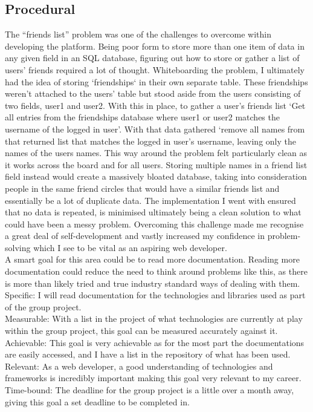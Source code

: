 \documentclass[lettersize,journal]{IEEEtran}
\begin{document}
\subsection{Procedural}
The “friends list” problem was one of the  challenges to overcome within developing the platform. Being poor form to store more than one item of data in any given field in an SQL database,
figuring out how to store or gather a list of users' friends required a lot of thought. Whiteboarding the problem, I ultimately had the idea of storing `friendships` in their own separate
table. These friendships weren’t attached to the users' table but stood aside from the users  consisting of two fields, user1 and user2. With this in place, to gather a user's friends
list ‘Get all entries from the friendships database where user1 or user2 matches the username of the logged in user’. With that data gathered ‘remove all names from that returned list
that matches the logged in user's username, leaving only the names of the users names. This way around the problem felt particularly clean as it works across the board and for all users.
Storing multiple names in a friend list field instead would create a massively bloated database, taking into consideration people in the same friend circles that would have a similar
friends list and essentially be a lot of duplicate data. The implementation I went with ensured that no data is repeated, is minimised ultimately being a clean solution to what could
have been a messy problem. Overcoming this challenge made me recognise a great deal of self-development and vastly increased my confidence in problem-solving which I see to be vital as an 
aspiring web developer.
\\ A smart goal for this area could be to read more documentation. Reading more documentation could reduce the need to think around problems like this, as there is more than likely tried and true 
industry standard ways of dealing with them.
\\Specific: I will read documentation for the technologies and libraries used as part of the group project.
\\Measurable: With a list in the project of what technologies are currently at play within the group project, this goal can be measured accurately against it.
\\Achievable: This goal is very achievable as for the most part the documentations are easily accessed, and I have a list in the repository of what has been used.
\\Relevant: As a web developer, a good understanding of technologies and frameworks is incredibly important making this goal very relevant to my career.
\\Time-bound: The deadline for the group project is a little over a month away, giving this goal a set deadline to be completed in.
\end{document}
